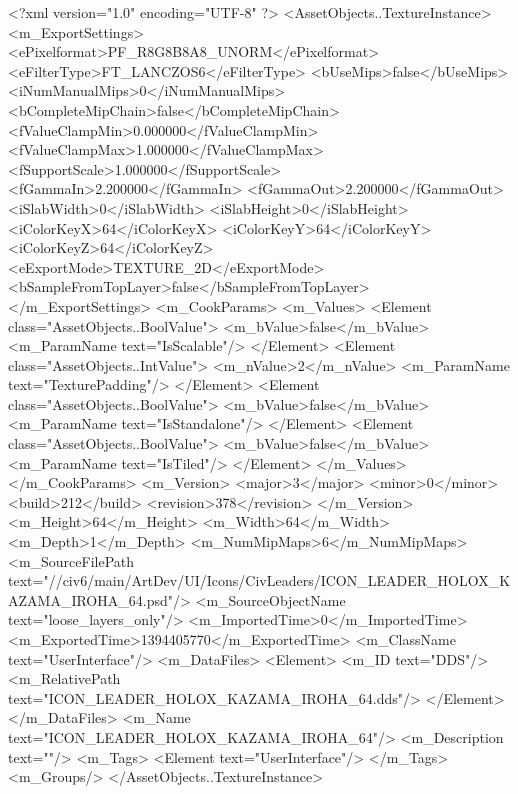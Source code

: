 <?xml version="1.0" encoding="UTF-8" ?>
<AssetObjects..TextureInstance>
	<m_ExportSettings>
		<ePixelformat>PF_R8G8B8A8_UNORM</ePixelformat>
		<eFilterType>FT_LANCZOS6</eFilterType>
		<bUseMips>false</bUseMips>
		<iNumManualMips>0</iNumManualMips>
		<bCompleteMipChain>false</bCompleteMipChain>
		<fValueClampMin>0.000000</fValueClampMin>
		<fValueClampMax>1.000000</fValueClampMax>
		<fSupportScale>1.000000</fSupportScale>
		<fGammaIn>2.200000</fGammaIn>
		<fGammaOut>2.200000</fGammaOut>
		<iSlabWidth>0</iSlabWidth>
		<iSlabHeight>0</iSlabHeight>
		<iColorKeyX>64</iColorKeyX>
		<iColorKeyY>64</iColorKeyY>
		<iColorKeyZ>64</iColorKeyZ>
		<eExportMode>TEXTURE_2D</eExportMode>
		<bSampleFromTopLayer>false</bSampleFromTopLayer>
	</m_ExportSettings>
	<m_CookParams>
		<m_Values>
			<Element class="AssetObjects..BoolValue">
				<m_bValue>false</m_bValue>
				<m_ParamName text="IsScalable"/>
			</Element>
			<Element class="AssetObjects..IntValue">
				<m_nValue>2</m_nValue>
				<m_ParamName text="TexturePadding"/>
			</Element>
			<Element class="AssetObjects..BoolValue">
				<m_bValue>false</m_bValue>
				<m_ParamName text="IsStandalone"/>
			</Element>
			<Element class="AssetObjects..BoolValue">
				<m_bValue>false</m_bValue>
				<m_ParamName text="IsTiled"/>
			</Element>
		</m_Values>
	</m_CookParams>
	<m_Version>
		<major>3</major>
		<minor>0</minor>
		<build>212</build>
		<revision>378</revision>
	</m_Version>
	<m_Height>64</m_Height>
	<m_Width>64</m_Width>
	<m_Depth>1</m_Depth>
	<m_NumMipMaps>6</m_NumMipMaps>
	<m_SourceFilePath text="//civ6/main/ArtDev/UI/Icons/CivLeaders/ICON_LEADER_HOLOX_KAZAMA_IROHA_64.psd"/>
	<m_SourceObjectName text="loose_layers_only"/>
	<m_ImportedTime>0</m_ImportedTime>
	<m_ExportedTime>1394405770</m_ExportedTime>
	<m_ClassName text="UserInterface"/>
	<m_DataFiles>
		<Element>
			<m_ID text="DDS"/>
			<m_RelativePath text="ICON_LEADER_HOLOX_KAZAMA_IROHA_64.dds"/>
		</Element>
	</m_DataFiles>
	<m_Name text="ICON_LEADER_HOLOX_KAZAMA_IROHA_64"/>
	<m_Description text=""/>
	<m_Tags>
		<Element text="UserInterface"/>
	</m_Tags>
	<m_Groups/>
</AssetObjects..TextureInstance>

